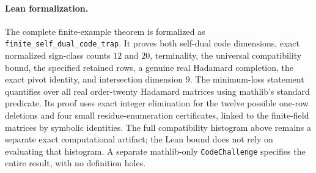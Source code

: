 \paragraph{Lean formalization.}
The complete finite-example theorem is formalized as \texttt{finite\_self\_dual\_}\allowbreak\texttt{code\_trap}. It proves both self-dual code dimensions, exact normalized sign-class counts $12$ and $20$, terminality, the universal compatibility bound, the specified retained rows, a genuine real Hadamard completion, the exact pivot identity, and intersection dimension $9$. The minimum-loss statement quantifies over all real order-twenty Hadamard matrices using mathlib's standard predicate. Its proof uses exact integer elimination for the twelve possible one-row deletions and four small residue-enumeration certificates, linked to the finite-field matrices by symbolic identities. The full compatibility histogram above remains a separate exact computational artifact; the Lean bound does not rely on evaluating that histogram. A separate mathlib-only \texttt{CodeChallenge} specifies the entire result, with no definition holes.
